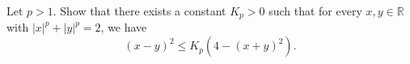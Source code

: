 Let \(p>1\). Show that there exists a constant \(K_{p} >0\) such that for every \(x,y\in \mathbb{R}\)
with \(|x|^{p}+|y|^{p}=2\), we have
\[(x-y)^{2} \leq K_{p}(4-(x+y)^{2}).\]